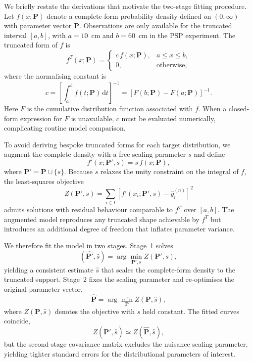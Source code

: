 \documentclass[12pt]{article}
\begin{document}
We briefly restate the derivations that motivate the two-stage fitting procedure. Let $f(x; \bm{P})$ denote a complete-form probability density defined on $(0, \infty)$ with parameter vector $\bm{P}$. Observations are only available for the truncated interval $[a, b]$, with $a = 10$~cm and $b = 60$~cm in the PSP experiment. The truncated form of $f$ is
\begin{equation}
  f^{T}(x; \bm{P}) =
    \begin{cases}
      c \, f(x; \bm{P}), & a \leq x \leq b, \\
      0, & \text{otherwise},
    \end{cases}
    \label{eq:truncated-density}
\end{equation}
where the normalising constant is
\begin{equation}
  c = \left[\int_a^b f(t; \bm{P}) \,\mathrm{d}t\right]^{-1} = \left[F(b; \bm{P}) - F(a; \bm{P})\right]^{-1}.
\end{equation}
Here $F$ is the cumulative distribution function associated with $f$. When a closed-form expression for $F$ is unavailable, $c$ must be evaluated numerically, complicating routine model comparison.

To avoid deriving bespoke truncated forms for each target distribution, we augment the complete density with a free scaling parameter $s$ and define
\begin{equation}
  f'(x; \bm{P}', s) = s \, f(x; \bm{P}),
\end{equation}
where $\bm{P}' = \bm{P} \cup \{s\}$. Because $s$ relaxes the unity constraint on the integral of $f$, the least-squares objective
\begin{equation}
  Z(\bm{P}', s) = \sum_{i \in I} \left[f'(x_i; \bm{P}', s) - \hat{y}_i^{(n)}\right]^2
\end{equation}
admits solutions with residual behaviour comparable to $f^{T}$ over $[a, b]$. The augmented model reproduces any truncated shape achievable by $f^{T}$ but introduces an additional degree of freedom that inflates parameter variance.

We therefore fit the model in two stages. Stage~1 solves
\begin{equation}
  (\widehat{\bm{P}'}, \hat{s}) = \arg\min_{\bm{P}', s} Z(\bm{P}', s),
\end{equation}
yielding a consistent estimate $\hat{s}$ that scales the complete-form density to the truncated support. Stage~2 fixes the scaling parameter and re-optimises the original parameter vector,
\begin{equation}
  \widehat{\bm{P}} = \arg\min_{\bm{P}} Z(\bm{P}, \hat{s}),
\end{equation}
where $Z(\bm{P}, \hat{s})$ denotes the objective with $s$ held constant. The fitted curves coincide,
\begin{equation}
  Z(\widehat{\bm{P}'}, \hat{s}) \simeq Z(\widehat{\bm{P}}, \hat{s}),
\end{equation}
but the second-stage covariance matrix excludes the nuisance scaling parameter, yielding tighter standard errors for the distributional parameters of interest.
\end{document}
